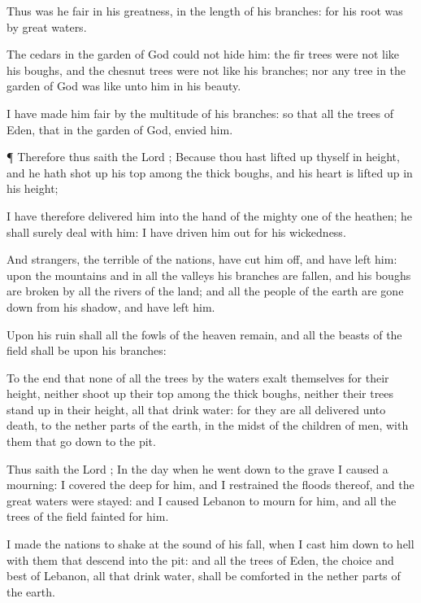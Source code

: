 {Thus was he
fair in his
greatness, in the
length of his
branches: for his
root was by
great
waters.

The
cedars in the
garden of
God could not
hide him: the fir
trees were not
like his
boughs, and the chesnut
trees were not like his
branches; nor any
tree in the
garden of
God was
like unto him in his
beauty.

I have
made him
fair by the
multitude of his
branches: so that all the
trees of
Eden, that
{} in the
garden of
God,
envied him.


\par }{\PP {}¶ Therefore thus
saith the
Lord
{}; Because thou hast lifted
up thyself in
height, and he hath shot
up his
top among the thick
boughs, and his
heart is lifted
up in his
height;

I have therefore
delivered him into the
hand of the mighty
one of the
heathen; he shall
surely
deal with him: I have driven him
out for his
wickedness.

And
strangers, the
terrible of the
nations, have cut him
off, and have
left him: upon the
mountains and in all the
valleys his
branches are
fallen, and his
boughs are
broken by all the
rivers of the
land; and all the
people of the
earth are gone
down from his
shadow, and have
left him.

Upon his
ruin shall all the
fowls of the
heaven
remain, and all the
beasts of the
field shall be upon his
branches:

To the end that none of all the
trees by the
waters
exalt themselves for their
height, neither shoot
up their
top among the thick
boughs, neither their
trees stand
up in their
height, all that
drink
water: for they are all
delivered unto
death, to the nether
parts of the
earth, in the
midst of the
children of
men, with them that go
down to the
pit.

Thus
saith the
Lord
{}; In the
day when he went
down to the
grave I caused a
mourning: I
covered the
deep for him, and I
restrained the
floods thereof, and the
great
waters were
stayed: and I caused
Lebanon to
mourn for him, and all the
trees of the
field
fainted for him.

I made the
nations to
shake at the
sound of his
fall, when I cast him
down to
hell with them that
descend into the
pit: and all the
trees of
Eden, the
choice and
best of
Lebanon, all that
drink
water, shall be
comforted in the nether
parts of the
earth.

}
